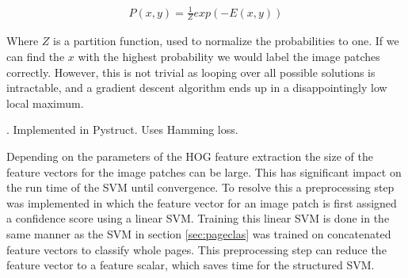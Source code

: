 \begin{align}
P(x, y) = \frac{1}{Z} exp(-E(x, y))
\end{align}

Where $Z$ is a partition function, used to normalize the probabilities to one.
If we can find the $x$ with the highest probability we would label
the image patches correctly. However, this is not trivial as
looping over all possible solutions is intractable, and a gradient descent
algorithm ends up in a disappointingly low local maximum\cite{bishop2006pattern}.

 \cite{joachims2009cutting}. Implemented in
Pystruct\cite{muller2013pystruct}. Uses Hamming loss.


Depending on the parameters of the HOG feature extraction the size of the
feature vectors for the image patches can be large. This has significant impact
on the run time of the SVM until convergence. To resolve this a preprocessing
step was implemented in which the feature vector for an image patch is first
assigned a confidence score using a linear SVM. Training this linear SVM is done
in the same manner as the SVM in section \ref{sec:pageclas} was trained on
concatenated feature vectors to classify whole pages. This preprocessing step
can reduce the feature vector to a feature scalar, which saves time for the
structured SVM.


